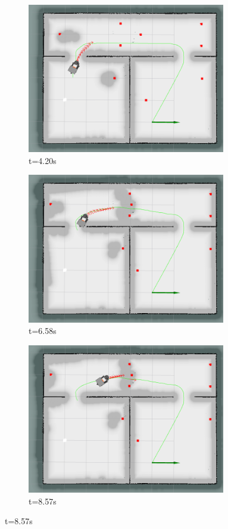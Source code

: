 \begin{figure}[!ht]
\begin{subfigure}[b]{0.35\linewidth}
        \includegraphics[width=0.95\textwidth]{images/teb_double/2/1170.png} \caption{t=4.20s}
    \end{subfigure}
    \begin{subfigure}[b]{0.35\linewidth}
        \centering
        \includegraphics[width=0.95\textwidth]{images/teb_double/2/1408.png} \caption{t=6.58s}
    \end{subfigure}%
    \begin{subfigure}[b]{0.35\linewidth}
        \centering
        \includegraphics[width=0.95\textwidth]{images/teb_double/2/1607.png} \caption{t=8.57s}

\end{subfigure}
\end{figure}

